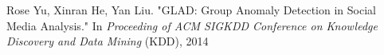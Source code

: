\documentclass[margin,line]{res}
\begin{document}
\begin{resume}
\begin{enumerate}[label={[C\arabic*]}]
\item Rose Yu, Xinran He, Yan Liu. "GLAD: Group Anomaly Detection in Social Media Analysis." In \textit{Proceeding of ACM SIGKDD Conference on Knowledge Discovery and Data Mining} (KDD), 2014


\end{enumerate}


\end{resume}
\end{document}
